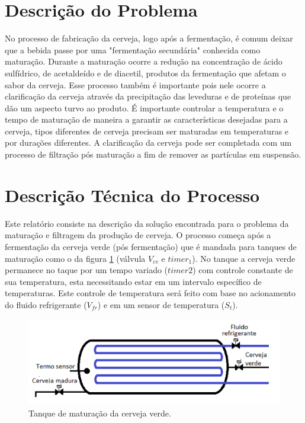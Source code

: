 \documentclass[twoside,twocolumn,12pt]{paper}
\begin{document}
	
	
	\tableofcontents
	\listoffigures
	\listoftables
	
	\section{Descrição do Problema}
	No processo de fabricação da cerveja, logo após a fermentação, é comum deixar que a bebida passe por uma "fermentação secundária" conhecida como maturação. Durante a maturação ocorre a redução na concentração de ácido sulfídrico, de acetaldeído e de diacetil, produtos da fermentação que afetam o sabor da cerveja. Esse processo também é importante pois nele ocorre a clarificação da cerveja através da precipitação das leveduras e de proteínas que dão um aspecto turvo ao produto. É importante controlar a temperatura e o tempo de maturação de maneira a garantir as características desejadas para a cerveja, tipos diferentes de cerveja precisam ser maturadas em temperaturas e por durações diferentes. A clarificação da cerveja pode ser completada com um processo de filtração pós maturação a fim de remover as partículas em suspensão.
	
	\section{Descrição Técnica do Processo}
	
	Este relatório consiste na descrição da solução encontrada para o problema da maturação e filtragem da produção de cerveja. O processo começa após a fermentação da cerveja verde (pós fermentação) que é mandada para tanques de maturação como o da figura \ref{fig:maturador} (válvula $V_{cv}$ e $timer_1$). No tanque a cerveja verde permanece no taque por um tempo variado ($timer2$) com controle constante de sua temperatura, esta necessitando estar em um intervalo específico de temperaturas. Este controle de temperatura será feito com base no acionamento do fluido refrigerante ($V_{fr}$) e em um sensor de temperatura ($S_t$).
	
	\begin{figure}
		\centering
		\includegraphics [width=\columnwidth]{tanque.png}
		\caption {Tanque de maturação da cerveja verde.}
		\label{fig:maturador}
	\end{figure}
	
\end{document}
